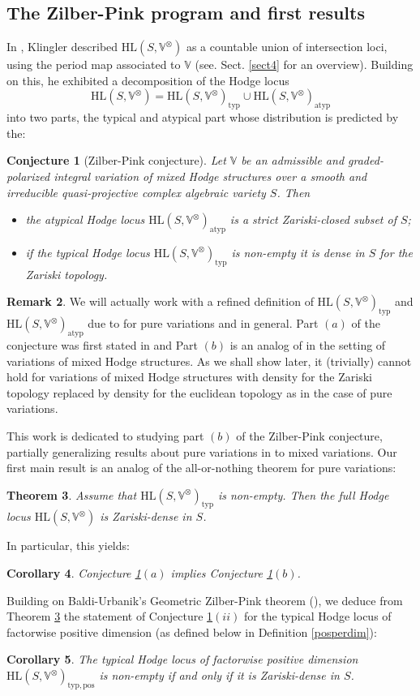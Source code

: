 \documentclass[10pt]{article}
\numberwithin{equation}{subsection}
\theoremstyle{plain}
\newtheorem{theorem}{Theorem}[section]
\newtheorem{corollary}[theorem]{Corollary}
\newtheorem{conjecture}[theorem]{Conjecture}
\theoremstyle{definition}
\newtheorem{remark}[theorem]{Remark}
\theoremstyle{remark}
\newcommand{\V}{\mathbb V}
\newcommand{\HL}{\mathrm{HL}(S, \V^\otimes)}
\newcommand{\typ}{\mathrm{typ}}
\newcommand{\atyp}{\mathrm{atyp}}
\begin{document}
\subsection*{The Zilber-Pink program and first results}
In \cite{klingler_atyp}, Klingler described $\HL$ as a countable union of intersection loci, using the period map associated to $\V$ (see. Sect. \ref{sect4} for an overview). Building on this, he exhibited a decomposition of the Hodge locus
\[
\HL = \HL_\typ \cup \HL_\atyp
\]
into two parts, the typical and atypical part whose distribution is predicted by the:
\begin{conjecture}[Zilber-Pink conjecture]\label{zpintr}
Let $\V$ be an admissible and graded-polarized integral variation of mixed Hodge structures over a smooth and irreducible quasi-projective complex algebraic variety $S$. Then
\begin{itemize}
\item[(a)] the atypical Hodge locus $\HL_\atyp$ is a strict Zariski-closed subset of $S$;
\item[(b)] if the typical Hodge locus $\HL_\typ$ is non-empty it is dense in $S$ for the Zariski topology.
\end{itemize}
\end{conjecture}
\begin{remark}
We will actually work with a refined definition of $\HL_\typ$ and $\HL_\atyp$ due to \cite[Def. 2.4, Conj. 2.5]{bku} for pure variations and \cite[Def. 4.8, Conj. 4.10]{bu} in general. Part $(a)$ of the conjecture was first stated in \cite[Conj. 1.10]{klingler_atyp} and Part $(b)$ is an analog of \cite[Conj. 2.7]{bku} in the setting of variations of mixed Hodge structures. As we shall show later, it (trivially) cannot hold for variations of mixed Hodge structures with density for the Zariski topology replaced by density for the euclidean topology as in the case of pure variations. 
\end{remark}
This work is dedicated to studying part $(b)$ of the Zilber-Pink conjecture, partially generalizing results about pure variations in \cite{bku, TT, es, ku, ketay} to mixed variations. Our first main result is an analog of the all-or-nothing theorem \cite[Thm. 3.9]{bku} for pure variations:
\begin{theorem}\label{aon}
Assume that $\HL_\typ$ is non-empty. Then the full Hodge locus $\HL$ is Zariski-dense in $S$.
\end{theorem}
In particular, this yields:
\begin{corollary}\label{zpimp}
Conjecture \ref{zpintr}$(a)$ implies Conjecture \ref{zpintr}$(b)$.
\end{corollary}
Building on Baldi-Urbanik's Geometric Zilber-Pink theorem (\cite[Thm. 7.1]{bu}), we deduce from Theorem \ref{aon} the statement of Conjecture \ref{zpintr}$(ii)$ for the typical Hodge locus of factorwise positive dimension (as defined below in Definition \ref{posperdim}):
\begin{corollary}\label{aontypos}
The typical Hodge locus of factorwise positive dimension $\HL_{\typ, \mathrm{pos}}$ is non-empty if and only if it is Zariski-dense in $S$.
\end{corollary}
\end{document}
